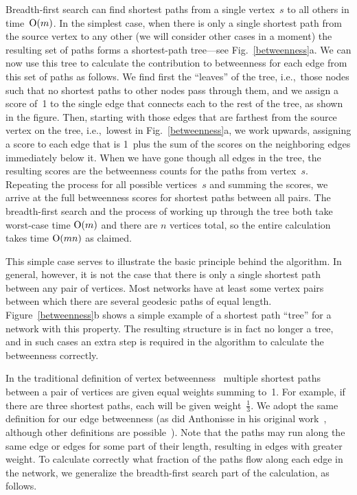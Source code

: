 \documentclass[twocolumn,pre,superscriptaddress]{revtex4}
\begin{document}
Breadth-first search can find shortest paths from a single vertex~$s$ to
all others in time~$\mathrm{O}(m)$.  In the simplest case, when there is only a
single shortest path from the source vertex to any other (we will consider
other cases in a moment) the resulting set of paths forms a shortest-path
tree---see Fig.~\ref{betweenness}a.  We can now use this tree to calculate
the contribution to betweenness for each edge from this set of paths as
follows.  We find first the ``leaves'' of the tree, i.e.,~those nodes such
that no shortest paths to other nodes pass through them, and we assign a
score of~1 to the single edge that connects each to the rest of the tree,
as shown in the figure.  Then, starting with those edges that are farthest
from the source vertex on the tree, i.e.,~lowest in
Fig.~\ref{betweenness}a, we work upwards, assigning a score to each edge
that is 1~plus the sum of the scores on the neighboring edges immediately
below it.  When we have gone though all edges in the tree, the resulting
scores are the betweenness counts for the paths from vertex~$s$.  Repeating
the process for all possible vertices~$s$ and summing the scores, we arrive
at the full betweenness scores for shortest paths between all pairs.  The
breadth-first search and the process of working up through the tree both
take worst-case time $\mathrm{O}(m)$ and there are $n$ vertices total, so the
entire calculation takes time $\mathrm{O}(mn)$ as claimed.

This simple case serves to illustrate the basic principle behind the
algorithm.  In general, however, it is not the case that there is only a
single shortest path between any pair of vertices.  Most networks have at
least some vertex pairs between which there are several geodesic paths of
equal length.  Figure~\ref{betweenness}b shows a simple example of a
shortest path ``tree'' for a network with this property.  The resulting
structure is in fact no longer a tree, and in such cases an extra step is
required in the algorithm to calculate the betweenness correctly.

In the traditional definition of vertex betweenness~\cite{Freeman77}
multiple shortest paths between a pair of vertices are given equal weights
summing to~1.  For example, if there are three shortest paths, each will be
given weight~$\frac13$.  We adopt the same definition for our edge
betweenness (as did Anthonisse in his original work~\cite{Anthonisse71},
although other definitions are possible~\cite{GKK01b}).  Note that the
paths may run along the same edge or edges for some part of their length,
resulting in edges with greater weight.  To calculate correctly what
fraction of the paths flow along each edge in the network, we generalize
the breadth-first search part of the calculation, as follows.
\end{document}
